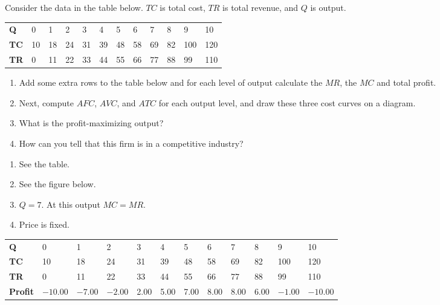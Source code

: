 \begin{enumialphparenastyle}
\begin{ex}\label{ex:ch9ex6}
Consider the data in the table below. $TC$ is total cost, $TR$ is total revenue, and $Q$ is output.
\begin{center}
\begin{tabu} to \linewidth {|X[1,c]X[1,c]X[1,c]X[1,c]X[1,c]X[1,c]X[1,c]X[1,c]X[1,c]X[1,c]X[1,c]X[1,c]|}	\hline
{}	\textbf{Q}	&	0	&	1	&	2	&	3	&	4	&	5	&	6	&	7	&	8	&	9	&	10	\\
						\textbf{TC}	&	10	&	18	&	24	&	31	&	39	&	48	&	58	&	69	&	82	&	100	&	120	\\
	\textbf{TR}	&	0	&	11	&	22	&	33	&	44	&	55	&	66	&	77	&	88	&	99	&	110	\\	\hline
\end{tabu}
\end{center}
\begin{enumerate}
	\item	Add some extra rows to the table below and for each level of output calculate the $MR$, the $MC$ and total profit.
	\item	Next, compute $AFC$, $AVC$, and $ATC$ for each output level, and draw these three cost curves on a diagram.
	\item	What is the profit-maximizing output?
	\item	How can you tell that this firm is in a competitive industry?
\end{enumerate}
\begin{sol}
\begin{enumerate}
	\item	See the table.
	\item	See the figure below.
	\item	$Q=7$. At this output $MC=MR$.
	\item	Price is fixed.
\end{enumerate}
\begin{center}\footnotesize 
	\begin{tabu} to \linewidth {|X[0.8,c]X[1,c]X[1,c]X[1,c]X[1,c]X[1,c]X[1,c]X[1,c]X[1,c]X[1,c]X[1,c]X[1,c]|}	\hline
			\textbf{Q}	&	0	&	1	&	2	&	3	&	4	&	5	&	6	&	7	&	8	&	9	&	10	\\
		\textbf{TC}	&	10	&	18	&	24	&	31	&	39	&	48	&	58	&	69	&	82	&	100	&	120	\\
			\textbf{TR}	&	0	&	11	&	22	&	33	&	44	&	55	&	66	&	77	&	88	&	99	&	110	\\
		\textbf{Profit}	& $-10.00$ & $-7.00$ & $-2.00$ & 2.00 & 5.00 & 7.00 & 8.00 & 8.00 & 6.00 & $-1.00$ & $-10.00$ \\

\end{tabu}
\end{center}
\end{sol}
\end{ex}
\end{enumialphparenastyle}
